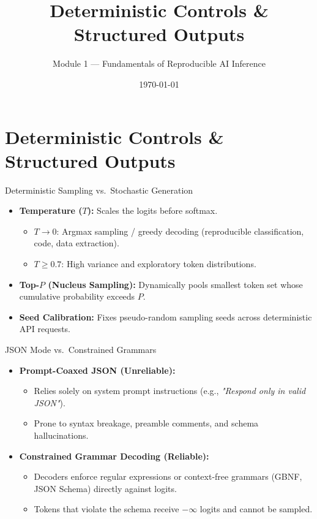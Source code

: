 \documentclass[xcolor=x11names,aspectratio=169]{beamer}
\title[AI 101 \textbar\ Module 1]{Deterministic Controls \& Structured Outputs}
\subtitle{Module 1 — Fundamentals of Reproducible AI Inference}
\author{}
\date{\today}
\begin{document}
\begin{frame}
  \titlepage
\end{frame}

\section{Deterministic Controls \& Structured Outputs}

\begin{frame}[fragile]{Deterministic Sampling vs.\ Stochastic Generation}
 \begin{itemize}
 \item \textbf{Temperature ($T$):} Scales the logits before softmax.
 \begin{itemize}
 \item $T \to 0$: Argmax sampling / greedy decoding (reproducible classification, code, data extraction).
 \item $T \ge 0.7$: High variance and exploratory token distributions.
 \end{itemize}
 \item \textbf{Top-$P$ (Nucleus Sampling):} Dynamically pools smallest token set whose cumulative probability exceeds $P$.
 \item \textbf{Seed Calibration:} Fixes pseudo-random sampling seeds across deterministic API requests.
 \end{itemize}
\end{frame}

\begin{frame}[fragile]{JSON Mode vs.\ Constrained Grammars}
 \begin{itemize}
 \item \textbf{Prompt-Coaxed JSON (Unreliable):}
 \begin{itemize}
 \item Relies solely on system prompt instructions (e.g., \textit{"Respond only in valid JSON"}).
 \item Prone to syntax breakage, preamble comments, and schema hallucinations.
 \end{itemize}
 \item \textbf{Constrained Grammar Decoding (Reliable):}
 \begin{itemize}
 \item Decoders enforce regular expressions or context-free grammars (GBNF, JSON Schema) directly against logits.
 \item Tokens that violate the schema receive $-\infty$ logits and cannot be sampled.
 \end{itemize}
 \end{itemize}
\end{frame}
\end{document}
